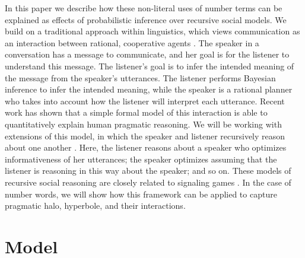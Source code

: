 \documentclass{article} %
\begin{document}
In this paper we describe how these non-literal uses of number terms can be explained as effects of probabilistic inference over recursive social models.
We build on a traditional approach within linguistics, which views communication as an interaction between rational, cooperative agents \cite{grice1975, clark1996using}. 
The speaker in a conversation has a message to communicate, and her goal is for the listener to understand this message. The listener's goal is to infer the intended meaning of the message from the speaker's utterances. The listener performs Bayesian inference to infer the intended meaning, while the speaker is a rational planner who takes into account how the listener will interpret each utterance. 
Recent work \cite{frankgoodmanscience, goodmanstuhlmueller} has shown that a simple formal model of this interaction is able to quantitatively explain human pragmatic reasoning. We will be working with extensions of this model, in which the speaker and listener recursively reason about one another \cite{jager2009pragmatic, bergen2012, franke2009interpretation}. Here, the listener reasons about a speaker who optimizes informativeness of her utterances; the speaker optimizes assuming that the listener is reasoning in this way about the speaker; and so on. These models of recursive social reasoning are closely related to signaling games \cite{cho1987signaling, chen2008selecting}. In the case of number words, we will show how this framework can be applied to capture pragmatic halo, hyperbole, and their interactions.


\section{Model}
\end{document}
